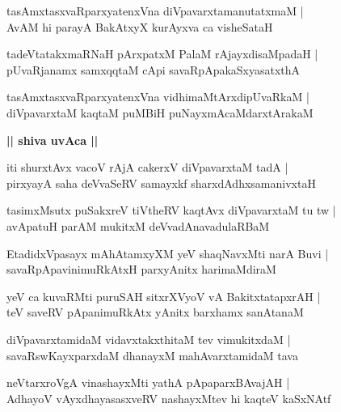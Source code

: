 \documentclass[twoside,12pt,openright]{book}
\newcounter{shloka}[chapter]
\def\uvaca#1{\centerline{{\large\textbf{#1}}}}
\begin{document}
\begin{shloka}%
tasAmxtasxvaRparxyatenxVna diVpavarxtamanutatxmaM |\\
AvAM hi parayA BakAtxyX kurAyxva ca visheSataH 
\end{shloka}

\begin{shloka}%
tadeVtatakxmaRNaH pArxpatxM PalaM rAjayxdisaMpadaH |\\
pUvaRjanamx samxqqtaM cApi savaRpApakaSxyasatxthA
\end{shloka}

\begin{shloka}%
tasAmxtasxvaRparxyatenxVna vidhimaMtArxdipUvaRkaM |\\
diVpavarxtaM kaqtaM puMBiH puNayxmAcaMdarxtArakaM 
\end{shloka}

\uvaca{|| shiva uvAca ||}

\begin{shloka}%
iti shurxtAvx vacoV rAjA cakerxV diVpavarxtaM tadA |\\
pirxyayA saha deVvaSeRV samayxkf sharxdAdhxsamanivxtaH 
\end{shloka}

\begin{shloka}%
tasimxMsutx puSakxreV tiVtheRV kaqtAvx diVpavarxtaM tu tw |\\
avApatuH parAM mukitxM deVvadAnavadulaRBaM 
\end{shloka}

\begin{shloka}%
EtadidxVpasayx mAhAtamxyXM yeV shaqNavxMti narA Buvi |\\
savaRpApavinimuRkAtxH parxyAnitx harimaMdiraM 
\end{shloka}

\begin{shloka}%
yeV ca kuvaRMti puruSAH sitxrXVyoV vA BakitxtatapxrAH |\\
teV saveRV pApanimuRkAtx yAnitx barxhamx sanAtanaM
\end{shloka}

\begin{shloka}%
diVpavarxtamidaM vidavxtakxthitaM tev vimukitxdaM |\\
savaRswKayxparxdaM dhanayxM mahAvarxtamidaM tava
\end{shloka}

\begin{shloka}%
neVtarxroVgA vinashayxMti yathA pApaparxBAvajAH |\\
AdhayoV vAyxdhayasasxveRV nashayxMtev hi kaqteV kaSxNAtf
\end{shloka}
\end{document}
